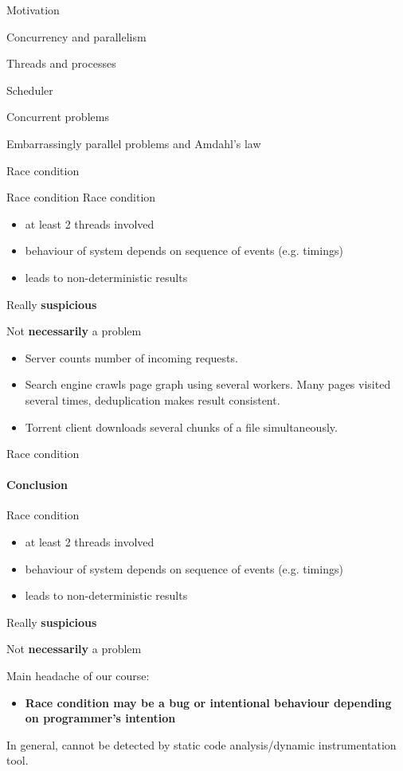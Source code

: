 \begin{section}{Motivation}
\begin{section}{Concurrency and parallelism}
\begin{section}{Threads and processes}
\begin{section}{Scheduler}
\begin{section}{Concurrent problems}
\begin{subsection}{Embarrassingly parallel problems and Amdahl's law}
\begin{subsection}{Race condition}
\begin{frame}[t,noframenumbering]{Race condition}
Race condition
\begin{itemize}
    \item at least 2 threads involved
    \item behaviour of system depends on sequence of events (e.g. timings)
    \item leads to non-deterministic results
\end{itemize}

Really \textbf{suspicious}
\pause

Not \textbf{necessarily} a problem
\begin{itemize}
    \item Server counts number of incoming requests.
    \item Search engine crawls page graph using several workers. Many pages visited several times, deduplication makes result consistent.
    \item Torrent client downloads several chunks of a file simultaneously.
\end{itemize}

\end{frame}

\begin{frame}[t,noframenumbering]{Race condition}
\framesubtitle{Conclusion}

Race condition
\begin{itemize}
    \item at least 2 threads involved
    \item behaviour of system depends on sequence of events (e.g. timings)
    \item leads to non-deterministic results
\end{itemize}

Really \textbf{suspicious}

Not \textbf{necessarily} a problem

\pause

Main headache of our course:
\begin{itemize}
 \item \textbf{Race condition may be a bug or intentional behaviour depending on programmer's intention}
\end{itemize}

In general, cannot be detected by static code analysis/dynamic instrumentation tool.
\end{frame}



\end{subsection}
\end{subsection}
\end{section}
\end{section}
\end{section}
\end{section}
\end{section}
